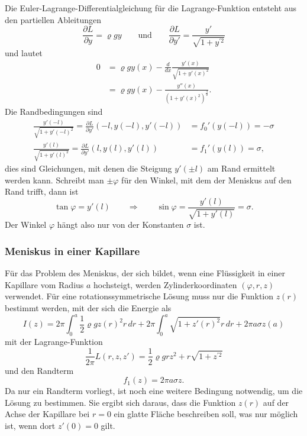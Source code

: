 

Die Euler-Lagrange-Differentialgleichung für die Lagrange-Funktion entsteht
aus den partiellen Ableitungen
\[
\frac{\partial L}{\partial y}
=
\varrho g y
\qquad\text{und}\qquad
\frac{\partial L}{\partial y'}
=
\frac{y'}{\sqrt{1+y^{\prime 2}}}
\]
und lautet
\begin{align*}
0
&=
\varrho g y(x)
-
\frac{d}{dx}
\frac{y'(x)}{\sqrt{1+y'(x)^2}}
\\
&=
\varrho g y(x)
-
\frac{ y''(x) }{(1+y'(x)^2)^{\frac32}}.
\end{align*}
Die Randbedingungen sind
\begin{align*}
\frac{y'(-l)}{\sqrt{1+y'(-l)^2}}
=
\frac{\partial L}{\partial y'}(-l,y(-l),y'(-l)) &= f_0'(y(-l)) = -\sigma
\\
\frac{y'(l)}{\sqrt{1+y'(l)^2}}
=
\frac{\partial L}{\partial y'}(l,y(l),y'(l)) &= f_1'(y(l)) = \sigma,
\end{align*}
dies sind Gleichungen, mit denen die Steigung $y'(\pm l)$ am Rand ermittelt
werden kann.
Schreibt man $\pm \varphi$ für den Winkel, mit dem der Meniskus auf
den Rand trifft, dann ist
\[
\tan\varphi
=
y'(l)
\qquad
\Rightarrow
\qquad
\sin\varphi
=
\frac{y'(l)}{\sqrt{1+y'(l)}}
=
\sigma.
\]
Der Winkel $\varphi$ hängt also nur von der Konstanten $\sigma$ ist.

%
%
\subsubsection{Meniskus in einer Kapillare}
Für das Problem des Meniskus, der sich bildet, wenn eine Flüssigkeit
in einer Kapillare vom Radius $a$ hochsteigt, werden Zylinderkoordinaten
$(\varphi,r,z)$ verwendet.
Für eine rotationssymmetrische Lösung muss nur die Funktion $z(r)$ 
bestimmt werden, mit der sich die Energie als
\[
I(z)
=
2\pi
\int_0^a
\frac12
\varrho g
z(r)^2
r
\,dr
+
2\pi
\int_0^a
\sqrt{1+z'(r)^2}
r\,dr
+
2\pi a
\sigma z(a)
\]
mit der Lagrange-Funktion
\[
\frac{1}{2\pi}
L(r, z, z')
=
\frac12
\varrho g
r
z^2 
+
r
\sqrt{1+z^{\prime 2}}
\]
und den Randterm
\[
f_1(z) = 2\pi a \sigma z.
\]
Da nur ein Randterm vorliegt, ist noch eine weitere Bedingung notwendig,
um die Lösung zu bestimmen.
Sie ergibt sich daraus, dass die Funktion $z(r)$ auf der Achse der Kapillare
bei $r=0$ ein glatte Fläche beschreiben soll, was nur möglich ist, wenn dort
$z'(0)=0$ gilt.

